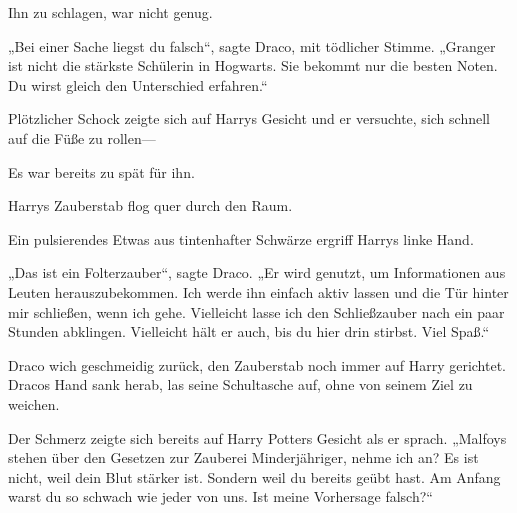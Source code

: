 Ihn zu schlagen, war nicht genug.

„Bei einer Sache liegst du falsch“, sagte Draco, mit tödlicher Stimme. „Granger ist nicht die stärkste Schülerin in Hogwarts. Sie bekommt nur die besten Noten. Du wirst gleich den Unterschied erfahren.“

Plötzlicher Schock zeigte sich auf Harrys Gesicht und er versuchte, sich schnell auf die Füße zu rollen—

Es war bereits zu spät für ihn.


Harrys Zauberstab flog quer durch den Raum.


Ein pulsierendes Etwas aus tintenhafter Schwärze ergriff Harrys linke Hand.

„Das ist ein Folterzauber“, sagte Draco. „Er wird genutzt, um Informationen aus Leuten herauszubekommen. Ich werde ihn einfach aktiv lassen und die Tür hinter mir schließen, wenn ich gehe. Vielleicht lasse ich den Schließzauber nach ein paar Stunden abklingen. Vielleicht hält er auch, bis du hier drin stirbst. Viel Spaß.“

Draco wich geschmeidig zurück, den Zauberstab noch immer auf Harry gerichtet. Dracos Hand sank herab, las seine Schultasche auf, ohne von seinem Ziel zu weichen.

Der Schmerz zeigte sich bereits auf Harry Potters Gesicht als er sprach. „Malfoys stehen über den Gesetzen zur Zauberei Minderjähriger, nehme ich an? Es ist nicht, weil dein Blut stärker ist. Sondern weil du bereits geübt hast. Am Anfang warst du so schwach wie jeder von uns. Ist meine Vorhersage falsch?“

